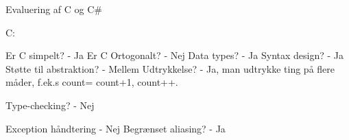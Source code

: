 Evaluering af C og C#

C: 

Er C simpelt?
	- Ja
Er C Ortogonalt?
	- Nej
Data types?
	- Ja
Syntax design?
	- Ja
Støtte til abstraktion?
	- Mellem
Udtrykkelse?
	- Ja, man udtrykke ting på flere måder, f.ek.s count= count+1, count++.

Type-checking?
	- Nej

Exception håndtering
	- Nej
Begrænset aliasing?
	- Ja